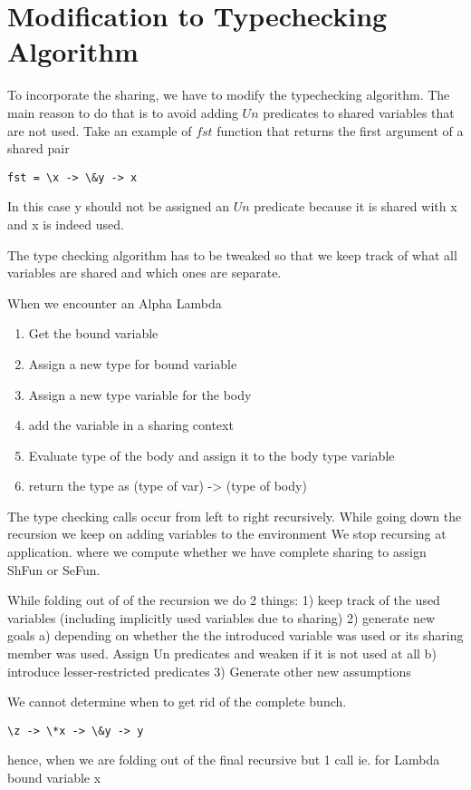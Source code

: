 
\section{Modification to Typechecking Algorithm}

To incorporate the sharing, we have to modify the typechecking algorithm.
The main reason to do that is to avoid adding $Un$ predicates to
shared variables that are not used. Take an example of $fst$ function
that returns the first argument of a shared pair
\begin{verbatim}
fst = \x -> \&y -> x
\end{verbatim}
In this case y should not be assigned an $Un$ predicate because
it is shared with x and x is indeed used.

The type checking algorithm has to be tweaked so that we keep track
of what all variables are shared and which ones are separate.

When we encounter an Alpha Lambda
\begin{enumerate}
\item Get the bound variable
\item Assign a new type for bound variable
\item Assign a new type variable for the body
\item add the variable in a sharing context
\item Evaluate type of the body and assign it to the body type variable
\item return the type as (type of var) -> (type of body)
\end{enumerate}



The type checking calls occur from left to right recursively.
While going down the recursion we keep on adding variables to the environment
We stop recursing at application. where we compute whether we have complete sharing to assign ShFun or SeFun.

While folding out of of the recursion we do 2 things:
1) keep track of the used variables (including implicitly used variables due to sharing)
2) generate new goals
   a) depending on whether the the introduced variable was used
      or its sharing member was used. Assign Un predicates and weaken if it is not used at all
   b) introduce lesser-restricted predicates
3) Generate other new assumptions

We cannot determine when to get rid of the complete bunch.
\begin{verbatim}
\z -> \*x -> \&y -> y
\end{verbatim}
hence, when we are folding out of the final recursive but 1 call ie. for Lambda bound variable x


